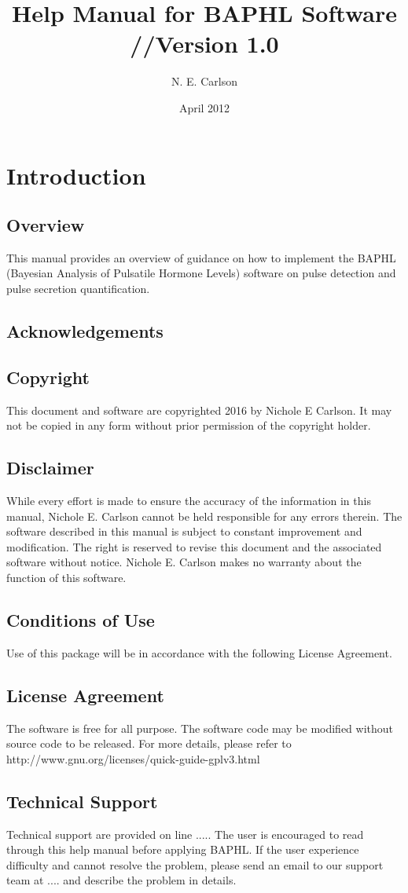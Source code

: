 \documentclass[11pt]{book}
\begin{document}
\author{N. E. Carlson}
\title{Help Manual for BAPHL Software //Version 1.0}
\date{April 2012}

\tableofcontents
\chapter{Introduction}
\section{Overview}
This manual provides an overview of guidance on how to implement the BAPHL (Bayesian Analysis of Pulsatile Hormone Levels) software on pulse detection and pulse secretion quantification.
\section{Acknowledgements}
\section{Copyright}
This document and software are copyrighted 2016 by Nichole E Carlson. It may not be copied in any form without prior permission of the copyright holder.
\section{Disclaimer}
    While every effort is made to ensure the accuracy of the information in this manual, Nichole E. Carlson cannot be held responsible for any errors therein. The software described in this manual is subject to constant improvement and modification.  The right is reserved to revise this document and the associated software without notice.  Nichole E. Carlson makes no warranty about the function of this software.
\section{Conditions of Use}
    Use of this package will be in accordance with the following License Agreement.
\section{License Agreement}
  The software is free for all purpose. The software code may be modified without source code to be released. For more details, please refer to http://www.gnu.org/licenses/quick-guide-gplv3.html
    
\section{Technical Support}
Technical support are provided on line ..... The user is encouraged to read through this help manual before applying BAPHL. If the user experience difficulty and  cannot resolve the problem, please send an email to our support team at .... and describe the problem in details. 
\end{document}
